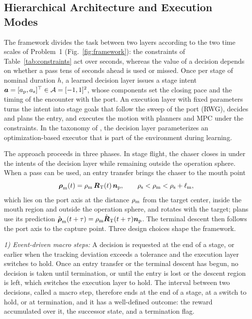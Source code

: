 \subsection{Hierarchical Architecture and Execution Modes}\label{sec:integration}

The framework divides the task between two layers according to the two time scales of Problem~1 (Fig.~\ref{fig:framework}): the constraints of Table~\ref{tab:constraints} act over seconds, whereas the value of a decision depends on whether a pass tens of seconds ahead is used or missed. Once per stage of nominal duration $h$, a learned decision layer issues a stage intent $\boldsymbol{a}=[a_{\mathrm{p}},a_{\mathrm{z}}]^{\top}\in\mathcal{A}=[-1,1]^{2}$, whose components set the closing pace and the timing of the encounter with the port. An execution layer with fixed parameters turns the intent into stage goals that follow the sweep of the port (RWG), decides and plans the entry, and executes the motion with planners and MPC under the constraints. In the taxonomy of \cite{reiter2026arc}, the decision layer parameterizes an optimization-based executor that is part of the environment during learning.

The approach proceeds in three phases. In stage flight, the chaser closes in under the intents of the decision layer while remaining outside the operation sphere. When a pass can be used, an entry transfer brings the chaser to the mouth point
\begin{equation}\label{eq:mouth}
\boldsymbol{\rho}_{\mathrm{m}}(t)=\rho_{\mathrm{m}}\,\boldsymbol{R}_{\mathrm{T}}(t)\,\boldsymbol{n}_{\mathrm{p}},\qquad \rho_{\mathrm{s}}<\rho_{\mathrm{m}}<\rho_{\mathrm{s}}+\ell_{\mathrm{m}},
\end{equation}
which lies on the port axis at the distance $\rho_{\mathrm{m}}$ from the target center, inside the mouth region and outside the operation sphere, and rotates with the target; plans use its prediction $\hat{\boldsymbol{\rho}}_{\mathrm{m}}(t+\tau)=\rho_{\mathrm{m}}\hat{\boldsymbol{R}}_{\mathrm{T}}(t+\tau)\boldsymbol{n}_{\mathrm{p}}$. The terminal descent then follows the port axis to the capture point. Three design choices shape the framework.

\textit{1) Event-driven macro steps:} A decision is requested at the end of a stage, or earlier when the tracking deviation exceeds a tolerance and the execution layer switches to hold. Once an entry transfer or the terminal descent has begun, no decision is taken until termination, or until the entry is lost or the descent region is left, which switches the execution layer to hold. The interval between two decisions, called a macro step, therefore ends at the end of a stage, at a switch to hold, or at termination, and it has a well-defined outcome: the reward accumulated over it, the successor state, and a termination flag.

